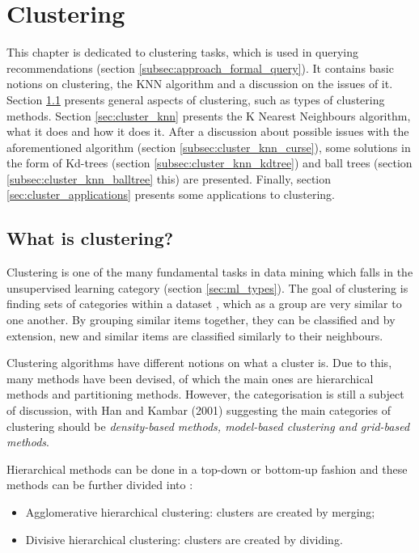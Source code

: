 \chapter{Clustering}
\label {chap:cluster}

This chapter is dedicated to clustering tasks, which is used in querying recommendations (section \ref{subsec:approach_formal_query}). It contains basic notions on clustering, the KNN algorithm and a discussion on the issues of it. Section \ref{sec:cluster_what} presents general aspects of clustering, such as types of clustering methods. Section \ref{sec:cluster_knn} presents the K Nearest Neighbours algorithm, what it does and how it does it. After a discussion about possible issues with the aforementioned algorithm (section \ref{subsec:cluster_knn_curse}), some solutions in the form of Kd-trees (section \ref{subsec:cluster_knn_kdtree}) and ball trees (section \ref{subsec:cluster_knn_balltree} this) are presented. Finally, section \ref{sec:cluster_applications} presents some applications to clustering.

\section{What is clustering?}
\label{sec:cluster_what}

Clustering is one of the many fundamental tasks in data mining which falls in the unsupervised learning category (section \ref{sec:ml_types}). The goal of clustering is finding sets of categories within a dataset \cite{clustering}, which as a group are very similar to one another. By grouping similar items together, they can be classified and by extension, new and similar items are classified similarly to their neighbours.

Clustering algorithms have different notions on what a cluster is. Due to this, many methods have been devised, of which the main ones are hierarchical methods and partitioning methods. However, the categorisation is still a subject of discussion, with Han and Kambar (2001) suggesting the main categories of clustering should be \textit{density-based methods, model-based clustering and grid-based methods}.

Hierarchical methods can be done in a top-down or bottom-up fashion and these methods can be further divided into \cite{clustering}:

\begin{itemize}
\item{Agglomerative hierarchical clustering: clusters are created by merging;}
\item{Divisive hierarchical clustering: clusters are created by dividing.}
\end{itemize} 


